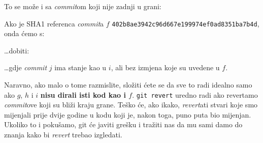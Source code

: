 To se može i sa \emph{commit}om koji nije zadnji u grani:



Ako je SHA1 referenca \emph{commit}a $f$ \verb+402b8ae3942c96d667e199974ef0ad8351ba7b4d+, onda ćemo s:


\dots{}dobiti:



\dots{}gdje \emph{commit} $j$ ima stanje kao u $i$, ali bez izmjena koje su uvedene u $f$.

Naravno, ako malo o tome razmislite, složiti ćete se da sve to radi idealno samo ako $g$, $h$ i $i$ \textbf{nisu dirali isti kod kao i $f$}.
\verb+git revert+ uredno radi ako revertamo \emph{commit}ove koji su bliži kraju grane.
Teško će, ako ikako, \emph{revert}ati stvari koje smo mijenjali prije dvije godine u kodu koji je, nakon toga, puno puta bio mijenjan.
Ukoliko to i pokušamo, git će javiti grešku i tražiti nas da mu sami damo do znanja kako bi \emph{revert} trebao izgledati.

